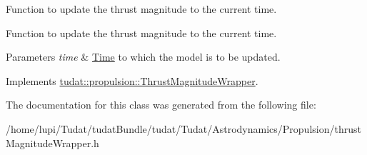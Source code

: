 Function to update the thrust magnitude to the current time. 

Function to update the thrust magnitude to the current time. 
\begin{DoxyParams}{Parameters}
{\em time} & \hyperlink{classtudat_1_1Time}{Time} to which the model is to be updated. \\
\hline
\end{DoxyParams}


Implements \hyperlink{classtudat_1_1propulsion_1_1ThrustMagnitudeWrapper_a6a515296199563f2fcece10923d6dcca}{tudat\+::propulsion\+::\+Thrust\+Magnitude\+Wrapper}.



The documentation for this class was generated from the following file\+:\begin{DoxyCompactItemize}
\item 
/home/lupi/\+Tudat/tudat\+Bundle/tudat/\+Tudat/\+Astrodynamics/\+Propulsion/thrust\+Magnitude\+Wrapper.\+h\end{DoxyCompactItemize}

